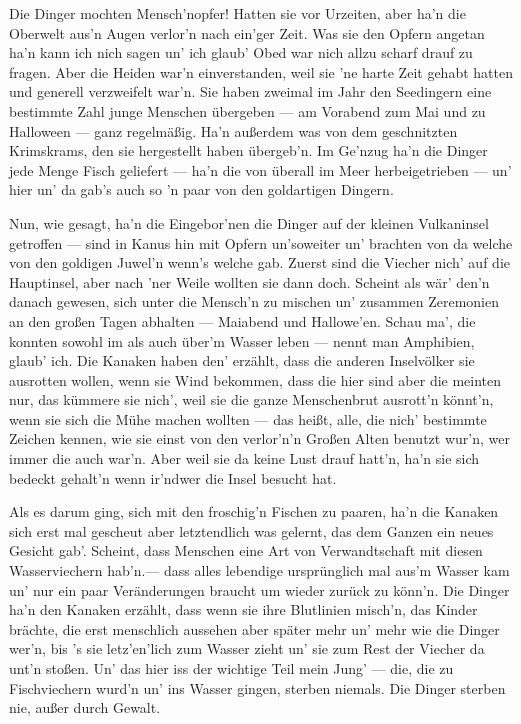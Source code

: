 Die Dinger mochten Mensch'nopfer! Hatten sie vor Urzeiten, aber ha'n die Oberwelt aus'n Augen verlor'n nach ein'ger Zeit. Was sie den Opfern angetan ha'n kann ich nich sagen un' ich glaub' Obed war nich allzu scharf drauf zu fragen. Aber die Heiden war'n einverstanden, weil sie 'ne harte Zeit gehabt hatten und generell verzweifelt war'n. Sie haben zweimal im Jahr den Seedingern eine bestimmte Zahl junge Menschen übergeben --- am Vorabend zum Mai und zu Halloween --- ganz regelmäßig. Ha'n außerdem was von dem geschnitzten Krimskrams, den sie hergestellt haben übergeb'n. Im Ge'nzug ha'n die Dinger jede Menge Fisch geliefert --- ha'n die von überall im Meer herbeigetrieben --- un' hier un' da gab's auch so 'n paar von den goldartigen Dingern.

Nun, wie gesagt, ha'n die Eingebor'nen die Dinger auf der kleinen Vulkaninsel getroffen --- sind in Kanus hin mit Opfern un'soweiter un' brachten von da welche von den goldigen Juwel'n wenn's welche gab. Zuerst sind die Viecher nich' auf die Hauptinsel, aber nach 'ner Weile wollten sie dann doch. Scheint als wär' den'n danach gewesen, sich unter die Mensch'n zu mischen un' zusammen Zeremonien an den großen Tagen abhalten --- Maiabend und Hallowe'en. Schau ma', die konnten sowohl im als auch über'm Wasser leben --- nennt man Amphibien, glaub' ich. Die Kanaken haben den' erzählt, dass die anderen Inselvölker sie ausrotten wollen, wenn sie Wind bekommen, dass die hier sind aber die meinten nur, das kümmere sie nich', weil sie die ganze Menschenbrut ausrott'n könnt'n, wenn sie sich die Mühe machen wollten --- das heißt, alle, die nich' bestimmte Zeichen kennen, wie sie einst von den verlor'n'n Großen Alten benutzt wur'n, wer immer die auch war'n. Aber weil sie da keine Lust drauf hatt'n, ha'n sie sich bedeckt gehalt'n wenn ir'ndwer die Insel besucht hat.

Als es darum ging, sich mit den froschig'n Fischen zu paaren, ha'n die Kanaken sich erst mal gescheut aber letztendlich was gelernt, das dem Ganzen ein neues Gesicht gab'. Scheint, dass Menschen eine Art von Verwandtschaft mit diesen Wasserviechern hab'n.--- dass alles lebendige ursprünglich mal aus'm Wasser kam un' nur ein paar Veränderungen braucht um wieder zurück zu könn'n. Die Dinger ha'n den Kanaken erzählt, dass wenn sie ihre Blutlinien misch'n, das Kinder brächte, die erst menschlich aussehen aber später mehr un' mehr wie die Dinger wer'n, bis 's sie letz'en'lich zum Wasser zieht un' sie zum Rest der Viecher da unt'n stoßen. Un' das hier iss der wichtige Teil mein Jung' --- die, die zu Fischviechern wurd'n un' ins Wasser gingen, sterben niemals. Die Dinger sterben nie, außer durch Gewalt.

